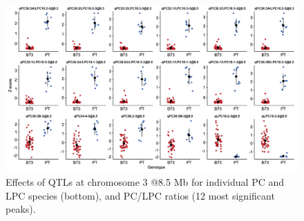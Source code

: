 \documentclass[9pt,twocolumn,twoside,lineno]{BioRxiv}
\begin{document}
\clearpage

\begin{figure}[t]
\begin{center}
\includegraphics[width=0.9\paperwidth]{Sup_Figures/Sup_Fig_2.png}
\caption{Effects of QTLs at chromosome 3 @8.5 Mb for individual PC and LPC species (bottom), and PC/LPC ratios (12 most significant peaks).
}

\label{SupFig2}
\end{center}
\end{figure} 

\clearpage
\end{document}

